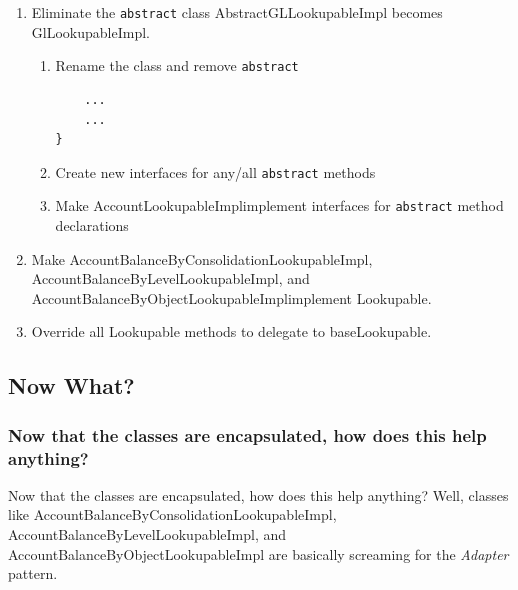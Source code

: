 \documentclass[12pt,notitlepage]{article}
\begin{document}
\begin{s5presentation}
      \begin{tex}
      \begin{enumerate}
        \item Eliminate the \texttt{abstract} class
          \sf AbstractGLLookupableImpl \rm becomes \sf GlLookupableImpl\rm.
          \begin{enumerate}
            \item Rename the class and remove \texttt{abstract}
              
              \begin{lstlisting}
    ...
    ...
}
              \end{lstlisting}
            \item Create new interfaces for any/all \texttt{abstract} methods
              
              
            \item Make \sf AccountLookupableImpl\rm implement interfaces for \texttt{abstract} method declarations
              
          \end{enumerate}
          \item Make \sf AccountBalanceByConsolidationLookupableImpl, AccountBalanceByLevelLookupableImpl, \rm and \sf 
      AccountBalanceByObjectLookupableImpl\rm implement \sf Lookupable. \rm
      
      
      
      
      \item Override all \sf Lookupable \rm methods to delegate to \sf baseLookupable\rm.
      \end{enumerate}
  \end{tex}
  
  \W \begin{s5slide}
    \W \section{Now What?} 
    \W \subsubsection{Now that the classes are encapsulated, how does this help anything?}
    \T Now that the classes are encapsulated, how does this help anything? Well, classes like \sf AccountBalanceByConsolidationLookupableImpl,
    AccountBalanceByLevelLookupableImpl, \rm and \sf AccountBalanceByObjectLookupableImpl are basically screaming for the \emph{Adapter}
    pattern. 
    \W \end{s5slide}
  

\end{s5presentation}
\end{document}
